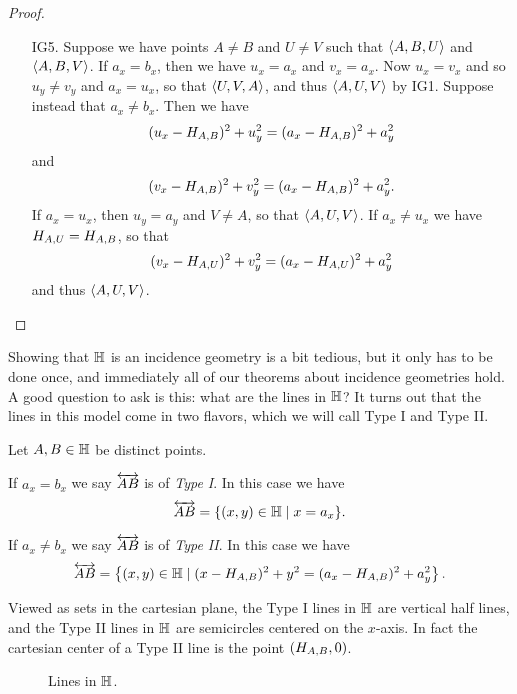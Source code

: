 \begin{proof}
\begin{itemize}
\item[IG5.] Suppose we have points \(A \neq B\) and \(U \neq V\) such that \(\langle A, B, U \rangle\) and \(\langle A, B, V \rangle\).
If \(a_x = b_x\), then we have \(u_x = a_x\) and \(v_x = a_x\).
Now \(u_x = v_x\) and so \(u_y \neq v_y\) and \(a_x = u_x\), so that \(\langle U, V, A \rangle\), and thus \(\langle A, U, V \rangle\) by IG1.
Suppose instead that \(a_x \neq b_x\).
Then we have \[ (u_x - H_{A,B})^2 + u_y^2 = (a_x - H_{A,B})^2 + a_y^2 \] and \[ (v_x - H_{A,B})^2 + v_y^2 = (a_x - H_{A,B})^2 + a_y^2. \]
If \(a_x = u_x\), then \(u_y = a_y\) and \(V \neq A\), so that \(\langle A, U, V \rangle\).
If \(a_x \neq u_x\) we have \(H_{A,U} = H_{A,B}\), so that \[ (v_x - H_{A,U})^2 + v_y^2 = (a_x - H_{A,U})^2 + a_y^2 \] and thus \(\langle A, U, V \rangle\).
\qedhere
\end{itemize}
\end{proof}

Showing that \(\mathbb{H}\) is an incidence geometry is a bit tedious, but it only has to be done once, and immediately all of our theorems about incidence geometries hold.
A good question to ask is this: what are the lines in \(\mathbb{H}\)?
It turns out that the lines in this model come in two flavors, which we will call Type I and Type II.

\begin{cor}
Let \(A, B \in \mathbb{H}\) be distinct points.
\begin{proplist}
\item If \(a_x = b_x\) we say \(\overleftrightarrow{AB}\) is of \emph{Type I}.
In this case we have \[ \overleftrightarrow{AB} = \{ (x,y) \in \mathbb{H} \mid x = a_x \}. \]
\item If \(a_x \neq b_x\) we say \(\overleftrightarrow{AB}\) is of \emph{Type II}.
In this case we have \[ \overleftrightarrow{AB} = \left\{ (x,y) \in \mathbb{H} \mid (x - H_{A,B})^2 + y^2 = (a_x - H_{A,B})^2 + a_y^2 \right\}. \]
\end{proplist}
\end{cor}

Viewed as sets in the cartesian plane, the Type I lines in \(\mathbb{H}\) are vertical half lines, and the Type II lines in \(\mathbb{H}\) are semicircles centered on the \(x\)-axis.
In fact the cartesian center of a Type II line is the point \((H_{A,B},0)\).

\begin{figure}[h]
\begin{center}
\caption{\label{fig:lines-in-hyp-half-plane}Lines in \(\mathbb{H}\).}
\end{center}
\end{figure}

